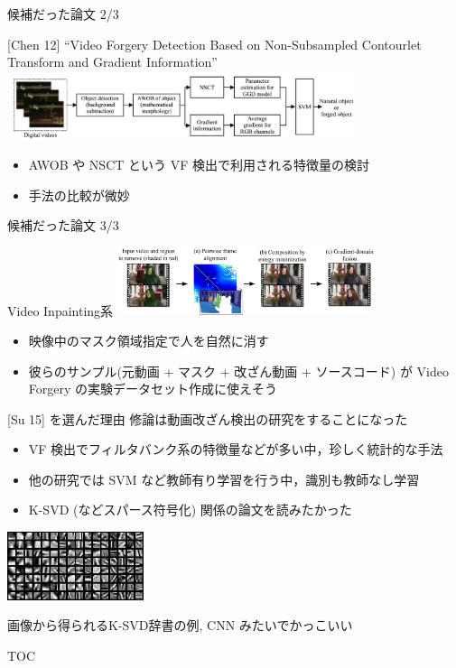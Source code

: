 \begin{frame}{候補だった論文 2/3}
\begin{block}{[Chen 12]}
``Video Forgery Detection Based on Non-Subsampled Contourlet Transform and Gradient Information''
\cite{Chen2012}
\includegraphics[height=2cm]{figure/chen0.png}
\end{block}
\begin{itemize}
    \item AWOB や NSCT という VF 検出で利用される特徴量の検討
    \item 手法の比較が微妙
\end{itemize}
\end{frame}


\begin{frame}{候補だった論文 3/3}
\begin{alertblock}{Video Inpainting系 }
\includegraphics[height=2cm]{figure/granados.png}
\end{alertblock}
\begin{itemize}
    \item 映像中のマスク領域指定で人を自然に消す
    \item 彼らのサンプル(元動画 + マスク + 改ざん動画 + ソースコード)
    が Video Forgery の実験データセット作成に使えそう
\end{itemize}
\end{frame}


\begin{frame}{[Su 15] を選んだ理由}
修論は動画改ざん検出の研究をすることになった

\begin{itemize}
    \item VF 検出でフィルタバンク系の特徴量などが多い中，珍しく統計的な手法
    \item 他の研究では SVM など教師有り学習を行う中，識別も教師なし学習
    \item K-SVD (などスパース符号化) 関係の論文を読みたかった
\end{itemize}

\includegraphics[height=2cm]{figure/ksvd.png}

画像から得られるK-SVD辞書の例\cite{Murata2012}, CNN みたいでかっこいい
\end{frame}


\begin{frame}{TOC}
\tableofcontents
\end{frame}
